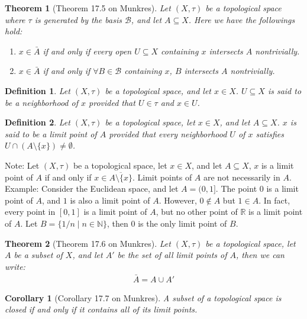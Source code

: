 \documentclass[11pt]{book}
\theoremstyle{break}
\theoremstyle{break}
\newtheorem{thm}{Theorem}[section]
\newtheorem{corT}[lem]{Corollary}
\newtheorem{defn}{Definition}[corL]
\newcommand{\R}{\mathbb{R}}
\newcommand{\N}{\mathbb{N}}
\newcommand{\note}{\color{red}Note: \color{black}}
\newcommand{\example}{\color{green}Example: \color{black}}
\begin{document}
\begin{thm}[Theorem 17.5 on Munkres]
Let $(X,\tau)$ be a topological space where $\tau$ is generated by the basis $\mathcal{B}$, and let $A\subseteq X$. Here we have the followings hold: 
\begin{enumerate}[topsep=3pt,itemsep=-1ex,partopsep=1ex,parsep=1ex]
\item $x \in\bar{A}$ if and only if every open $U \subseteq X$ containing $x$ intersects $A$ nontrivially.
\item $x \in \bar{A}$ if and only if $\forall B \in \mathcal{B}$ containing $x$, $B$ intersects $A$ nontrivially.
\end{enumerate}
\end{thm}

\begin{defn}
Let $(X,\tau)$ be a topological space, and let $x \in X$. $U\subseteq X$ is said to be a neighborhood of $x$ provided that $U\in \tau$ and $x \in U$. 
\end{defn}

\begin{defn}
Let $(X,\tau)$ be a topological space, let $x \in X$, and let $A \subseteq X$. $x$ is said to be a limit point of $A$ provided that every neighborhood $U$ of $x$ satisfies $U\cap (A\setminus \{x\}) \neq \emptyset$. 
\end{defn}

\note Let $(X,\tau)$ be a topological space, let $x \in X$, and let $A \subseteq X$, $x$ is a limit point of $A$ if and only if $x \in \overline{A\setminus \{x\}}$. Limit points of $A$ are not necessarily in $A$.\\

\example Consider the Euclidean space, and let $A =(0,1]$. The point $0$ is a limit point of $A$, and $1$ is also a limit point of $A$. However, $0 \notin A$ but $1 \in A$. In fact, every point in $[0,1]$ is a limit point of $A$, but no other point of $\R$ is a limit point of $A$. Let $B = \{1/n \mid n \in \N\}$, then $0$ is the only limit point of $B$. \\

\begin{thm}[Theorem 17.6 on Munkres]
Let $(X,\tau)$ be a topological space, let $A$ be a subset of $X$, and let $A'$ be the set of all limit points of $A$, then we can write:
\begin{align*}
\bar{A} = A \cup A'
\end{align*}
\end{thm}
\begin{corT}[Corollary 17.7 on Munkres]
A subset of a topological space is closed if and only if it contains all of its limit points.
\end{corT}
\end{document}
